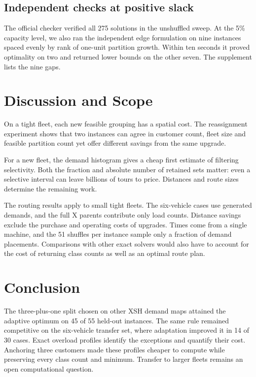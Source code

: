 \documentclass[runningheads]{llncs}
\begin{document}
\subsection{Independent checks at positive slack}
The official checker verified all 275 solutions in the unshuffled sweep. At the 5\% capacity level, we also ran the independent edge formulation on nine instances spaced evenly by rank of one-unit partition growth. Within ten seconds it proved optimality on two and returned lower bounds on the other seven. The supplement lists the nine gaps.



\section{Discussion and Scope}
On a tight fleet, each new feasible grouping has a spatial cost. The reassignment experiment shows that two instances can agree in customer count, fleet size and feasible partition count yet offer different savings from the same upgrade.

For a new fleet, the demand histogram gives a cheap first estimate of filtering selectivity. Both the fraction and absolute number of retained sets matter: even a selective interval can leave billions of tours to price. Distances and route sizes determine the remaining work.

The routing results apply to small tight fleets. The six-vehicle cases use generated demands, and the full X parents contribute only load counts. Distance savings exclude the purchase and operating costs of upgrades. Times come from a single machine, and the 51 shuffles per instance sample only a fraction of demand placements. Comparisons with other exact solvers would also have to account for the cost of returning class counts as well as an optimal route plan.

\section{Conclusion}
The three-plus-one split chosen on other XSH demand maps attained the adaptive optimum on 45 of 55 held-out instances. The same rule remained competitive on the six-vehicle transfer set, where adaptation improved it in 14 of 30 cases. Exact overload profiles identify the exceptions and quantify their cost. Anchoring three customers made these profiles cheaper to compute while preserving every class count and minimum. Transfer to larger fleets remains an open computational question.
\end{document}

